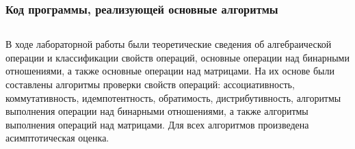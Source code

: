 \documentclass[bachelor, och, labwork]{shiza}
\begin{document}
        \subsubsection{Код программы, реализующей основные алгоритмы}
            \inputminted{python}{code/lab3.py}
      


\conclusion
В ходе лабораторной работы были теоретические сведения об алгебраической операции 
и классификации свойств операций, основные операции над бинарными отношениями, а 
также основные операции над матрицами. На их основе были составлены алгоритмы проверки 
свойств операций: ассоциативность, коммутативность, идемпотентность, обратимость,
дистрибутивность, алгоритмы выполнения операции над бинарными отношениями, а также 
алгоритмы выполнения операций над матрицами. Для всех алгоритмов произведена 
асимптотическая оценка.
\end{document}
